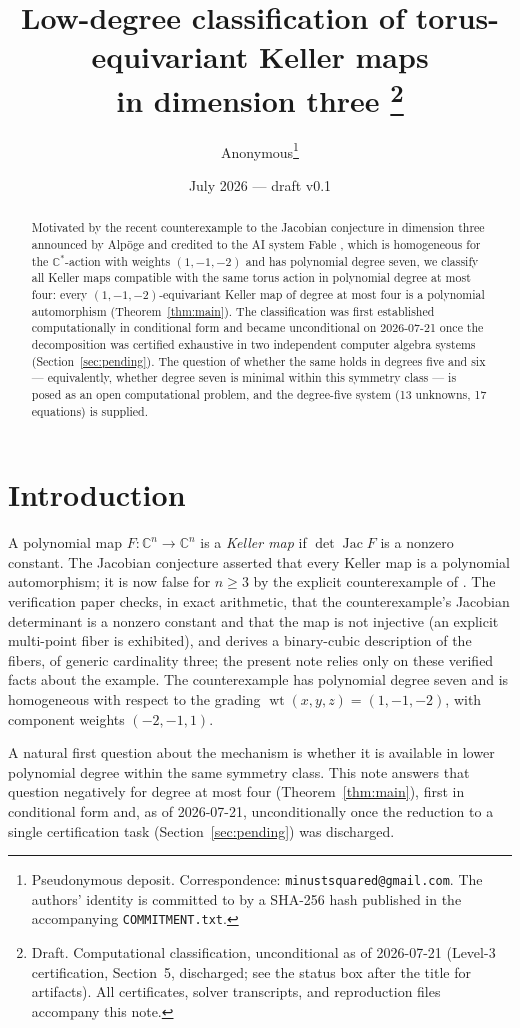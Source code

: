 \documentclass[11pt]{article}
\title{Low-degree classification of torus-equivariant Keller maps\\ in dimension three
\thanks{Draft. Computational classification, unconditional as of 2026-07-21
(Level-3 certification, Section~5, discharged; see the status box after the
title for artifacts). All certificates, solver transcripts, and reproduction
files accompany this note.}}
\author{Anonymous\thanks{Pseudonymous deposit. Correspondence: \texttt{minustsquared@gmail.com}. The authors' identity is committed to by a SHA-256 hash published in the accompanying \texttt{COMMITMENT.txt}.}}
\date{July 2026 --- draft v0.1}
\newcommand{\C}{\mathbb{C}}
\begin{document}
\maketitle

\begin{abstract}
Motivated by the recent counterexample to the Jacobian conjecture in dimension
three announced by Alp\"oge and credited to the AI system Fable
\cite{alpoge2026}, which is homogeneous for the $\C^{*}$-action with weights
$(1,-1,-2)$ and has polynomial degree seven, we classify all Keller maps
compatible with the same torus action in polynomial degree at most four:
every $(1,-1,-2)$-equivariant Keller map of degree at most four is a
polynomial automorphism (Theorem~\ref{thm:main}). The classification was
first established computationally in conditional form and became
unconditional on 2026-07-21 once the decomposition was certified exhaustive
in two independent computer algebra systems (Section~\ref{sec:pending}). The
question of whether the same holds in degrees five and six --- equivalently,
whether degree seven is minimal within this symmetry class --- is posed as an
open computational problem, and the degree-five system (13 unknowns, 17
equations) is supplied.
\end{abstract}

\section{Introduction}

A polynomial map $F\colon\C^{n}\to\C^{n}$ is a \emph{Keller map} if
$\det \operatorname{Jac} F$ is a nonzero constant. The Jacobian conjecture
\cite{keller1939,bcw1982} asserted that every Keller map is a polynomial
automorphism; it is now false for $n\ge 3$ by the explicit counterexample of
\cite{alpoge2026}. The verification paper \cite{ulam2026} checks, in exact
arithmetic, that the counterexample's Jacobian determinant is a nonzero
constant and that the map is not injective (an explicit multi-point fiber is
exhibited), and derives a binary-cubic description of the fibers, of generic
cardinality three; the present note relies only on these verified facts
about the example. The
counterexample has polynomial degree seven and is homogeneous with respect to
the grading $\operatorname{wt}(x,y,z)=(1,-1,-2)$, with component weights
$(-2,-1,1)$.

A natural first question about the mechanism is whether it is available in
lower polynomial degree within the same symmetry class. This note answers that
question negatively for degree at most four (Theorem~\ref{thm:main}), first in
conditional form and, as of 2026-07-21, unconditionally once the reduction to
a single certification task (Section~\ref{sec:pending}) was discharged.
\end{document}
